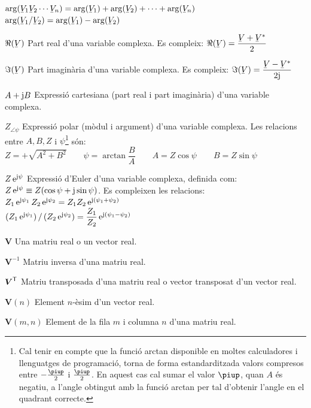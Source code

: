 \begin{list}{}
      $\arg(\cmplx{V}_1 \cmplx{V}_2 \cdots \cmplx{V}_n) = \arg(\cmplx{V}_1) + \arg (\cmplx{V}_2) + \cdots + \arg(\cmplx{V}_n)$\\[1ex]
      $\arg(\cmplx{V}_1 / \cmplx{V}_2) = \arg(\cmplx{V}_1) - \arg (\cmplx{V}_2)$
    \item[$\Re(\cmplx{V})$] Part real d'una variable complexa. Es compleix: $\Re(\cmplx{V}) = \dfrac{\cmplx{V} + \cmplx{V}^*}{2}$
    \item[$\Im(\cmplx{V})$] Part imagin\`{a}ria d'una variable complexa. Es compleix: $\Im(\cmplx{V}) = \dfrac{\cmplx{V} - \cmplx{V}^*}{2 \ju}$
    \item[$A+\mathrm{j} B$] Expressi\'{o} cartesiana (part real i part
    imagin\`{a}ria) d'una variable complexa.
    \item[$Z_{\angle \psi}$] Expressi\'{o} polar (m\`{o}dul i argument) d'una variable
    complexa. Les relacions entre $A, B, Z$ i $\psi$\footnote{Cal tenir en compte que la funci\'{o} \textsf{arctan} disponible en moltes calculadores i llenguatges de programaci\'{o}, torna de forma  estandarditzada valors compresos entre $-\frac{\piup}{2}$ i $\frac{\piup}{2}$. En aquest cas cal sumar el valor $\piup$, quan $A$ \'{e}s negatiu, a l'angle obtingut amb la funci\'{o} \textsf{arctan} per tal d'obtenir l'angle en el quadrant correcte.} s\'{o}n:\\[1ex]
    $Z=+\sqrt{A^2+B^2}\quad\quad\psi=\arctan{\dfrac{B}{A}}\quad\quad
    A=Z\cos\psi\quad\quad B=Z\sin\psi$
    \item[$Z\,\mathrm{e}^{\mathrm{j}\psi}$] Expressi\'{o} d'Euler d'una variable complexa, definida com:
     $Z\,\mathrm{e}^{\mathrm{j}\psi} \equiv Z(\cos\psi+\mathrm{j}\sin\psi)$.
     Es compleixen les relacions:\\[1ex]
     $Z_1\,\mathrm{e}^{\mathrm{j}\psi_1} \, Z_2\,\mathrm{e}^{\mathrm{j}\psi_2} = Z_1 Z_2\,\mathrm{e}^{\mathrm{j}(\psi_1+\psi_2)}$\\[1ex]
     $(Z_1\,\mathrm{e}^{\mathrm{j}\psi_1}) \,/\, (Z_2\,\mathrm{e}^{\mathrm{j}\psi_2}) = \dfrac{Z_1}{Z_2}\,\mathrm{e}^{\mathrm{j}(\psi_1-\psi_2)}$
    \item[$\boldsymbol{V}$] Una matriu real o un vector real.
    \item[$\boldsymbol{V}^{-1}$] Matriu inversa d'una matriu real.
    \item[$\boldsymbol{V}^\mathrm{\textsf{T}}$] Matriu transposada d'una matriu real o vector
    transposat d'un vector real.
    \item[$\boldsymbol{V}(n)$] Element $n$-\`{e}sim d'un vector real.
    \item[$\boldsymbol{V}(m,n)$] Element de la fila $m$ i columna $n$ d'una matriu real.

\end{list}
